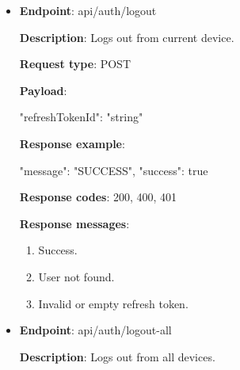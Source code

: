 \begin{itemize}
    \textbf{Response example}:

    \begin{spverbatim}
    {
        "refreshTokenId": "string",
        "accessToken": "string",
        "message": "SUCCESS",
        "success": true
    }
    \end{spverbatim}

    \textbf{Response codes}: 200, 400, 401

    \textbf{Response messages}:
    \begin{enumerate}
        \item Success.
        \item Invalid or empty refresh token.
    \end{enumerate}

    \pagebreak

    \item \textbf{Endpoint}: api/auth/logout

    \textbf{Description}: Logs out from current device.

    \textbf{Request type}: POST

    \textbf{Payload}:

    \begin{spverbatim}
    {
        "refreshTokenId": "string"
    }
    \end{spverbatim}

    \textbf{Response example}:

    \begin{spverbatim}
    {
        "message": "SUCCESS",
        "success": true
    }
    \end{spverbatim}

    \textbf{Response codes}: 200, 400, 401

    \textbf{Response messages}:
    \begin{enumerate}
        \item Success.
        \item User not found.
        \item Invalid or empty refresh token.
    \end{enumerate}

    \vspace{4mm}

    \item \textbf{Endpoint}: api/auth/logout-all

    \textbf{Description}: Logs out from all devices.


\end{itemize}

